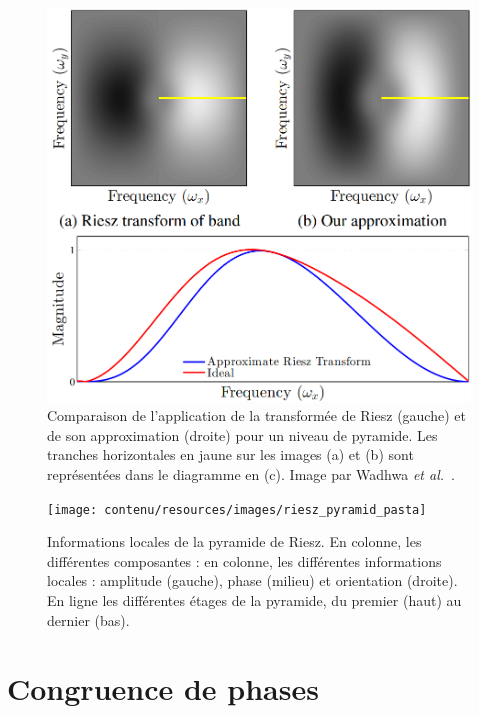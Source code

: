 \begin{figure}[H]
    \centering
    \includegraphics[width=.65\textwidth]{contenu/resources/images/riesz_approximation}
    \caption[Approximation de la transformée de Riesz]{Comparaison de l'application de la transformée de Riesz (gauche) et de son approximation (droite) pour un niveau de pyramide. Les tranches horizontales en jaune sur les images (a) et (b) sont représentées dans le diagramme en (c). Image par Wadhwa \textit{et al.}~\cite{wadhwa_riesz_2014}.}
    \label{fig:riesz-approximation}
\end{figure}

\begin{figure}[hp]
    \centering
    \texttt{[image: contenu/resources/images/riesz\_pyramid\_pasta]}
    \caption[Informations locales de la pyramide de Riesz]{Informations locales de la pyramide de Riesz. En colonne, les différentes composantes : en colonne, les différentes informations locales : amplitude (gauche), phase (milieu) et orientation (droite). En ligne les différentes étages de la pyramide, du premier (haut) au dernier (bas).}
    \label{fig:riesz-pyramid-local}
\end{figure}

\section{Congruence de phases}

